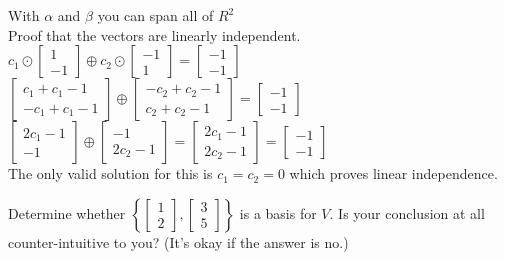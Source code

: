\begin{solution}
            With $\alpha$ and $\beta$ you can span all of $R^2$
            \\
            Proof that the vectors are linearly independent.
            $c_1 \odot \begin{bmatrix} 1 \\ -1\end{bmatrix}
            \oplus c_2 \odot \begin{bmatrix} -1 \\ 1\end{bmatrix} =  
            \begin{bmatrix} -1 \\ -1\end{bmatrix}
            $
            \\
            $
             \begin{bmatrix} c_1+c_1-1 \\ -c_1+c_1-1\end{bmatrix} \oplus
             \begin{bmatrix} -c_2+c_2-1 \\ c_2+c_2-1\end{bmatrix}=  
             \begin{bmatrix} -1 \\ -1\end{bmatrix}
            $
            \\
            $
            \begin{bmatrix} 2c_1-1 \\ -1\end{bmatrix} \oplus
            \begin{bmatrix} -1 \\ 2c_2-1\end{bmatrix} =
            \begin{bmatrix} 2c_1-1 \\ 2c_2-1\end{bmatrix} =
            \begin{bmatrix} -1 \\ -1\end{bmatrix}
            $
            \\
            The only valid solution for this is $c_1=c_2=0$ which proves linear independence.
		\end{solution}
		
		\item Determine whether
		$\left\lbrace
		\begin{bmatrix} 1 \\ 2 \end{bmatrix},
		\begin{bmatrix} 3 \\ 5 \end{bmatrix}\right\rbrace$	
		is a basis for $V$.
		Is your conclusion at all counter-intuitive to you? (It's okay if the answer is no.)
		

